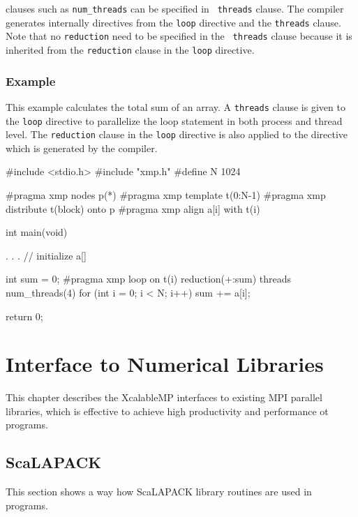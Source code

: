    {\OMP} clauses such as {\tt num\_threads} can be specified in {\tt
   threads} clause.
   The {\XMP} compiler generates internally {\OMP} directives from the
   {\tt loop} directive and the {\tt threads} clause.
   Note that no {\tt reduction} need to be specified in the {\tt
   threads} clause because it is inherited from the {\tt reduction}
   clause in the {\tt loop} directive.

\subsection*{Example}

   This example calculates the total sum of an array.
   A {\tt threads} clause is given to the {\tt loop} directive to
   parallelize the loop statement in both process and
   thread level. 
   The {\tt reduction} clause in the {\tt loop} directive is also
   applied to the {\OMP} directive which is generated by the {\XMP}
   compiler.

\begin{XCexample}
#include <stdio.h>
#include "xmp.h"
#define N 1024

#pragma xmp nodes p(*)
#pragma xmp template t(0:N-1)
#pragma xmp distribute t(block) onto p
#pragma xmp align a[i] with t(i)

int main(void) {
  . . . // initialize a[]

  int sum = 0;
#pragma xmp loop on t(i) reduction(+:sum) threads num_threads(4)
  for (int i = 0; i < N; i++) {
    sum += a[i];
  }

  return 0;
}
\end{XCexample}


\chapter{Interface to Numerical Libraries}

   This chapter describes the XcalableMP interfaces to existing MPI
   parallel libraries, which is effective to achieve high productivity
   and performance ot {\XMP} programs.
   
\section{ScaLAPACK}

   This section shows a way how ScaLAPACK library routines are used in
   {\XMP} programs.

